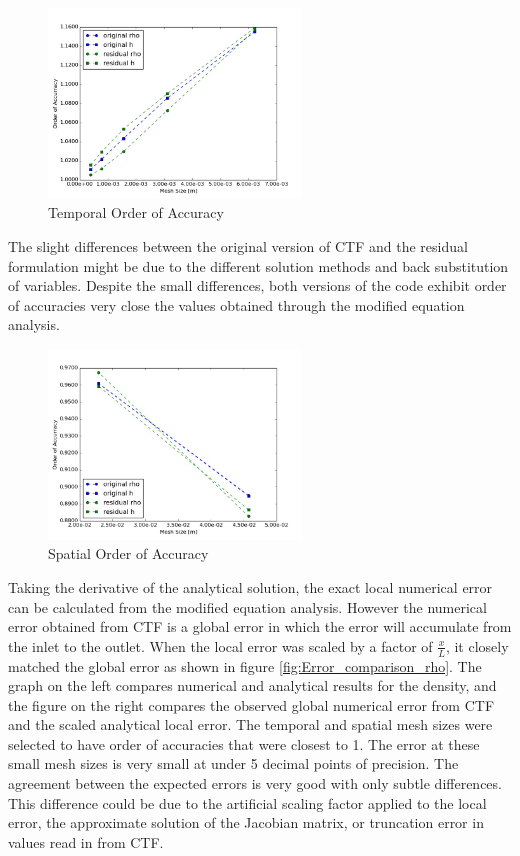 \begin{figure}[!h]
	\centering
	\includegraphics[width=0.60\textwidth]{images/Temporal_Study/Order_Of_Accuracy_Summary}
	\caption{Temporal Order of Accuracy}
	\label{fig:Temporal:OOA}
\end{figure}

The slight differences between the original version of CTF and the residual
formulation might be due to the different solution methods and back substitution
of variables. Despite the small differences, both versions of the code exhibit
order of accuracies very close the values obtained through the modified
equation analysis.

\begin{figure}[!h]
	\centering
	\includegraphics[width=0.60\textwidth]{images/Spatial_Study/Order_Of_Accuracy_Summary}
	\caption{Spatial Order of Accuracy}
	\label{fig:Spatial:OOA}
\end{figure}

Taking the derivative of the analytical solution, the exact local numerical
error can be calculated from the modified equation analysis. However the
numerical error obtained from CTF is a global error in which the error will
accumulate from the inlet to the outlet. When the local error was scaled by a
factor of $\frac{x}{L}$, it closely matched the global error as shown in figure
\ref{fig:Error_comparison_rho}. The graph on the left compares numerical and
analytical results for the density, and the figure on the right compares the
observed global numerical error from CTF and the scaled analytical local error.
The temporal and spatial mesh sizes were selected to have order of accuracies
that were closest to 1. The error at these small mesh sizes is very small at
under 5 decimal points of precision. The agreement between the expected errors
is very good with only subtle differences. This difference could be due to the
artificial scaling factor applied to the local error, the approximate solution
of the Jacobian matrix, or truncation error in values read in from CTF.

